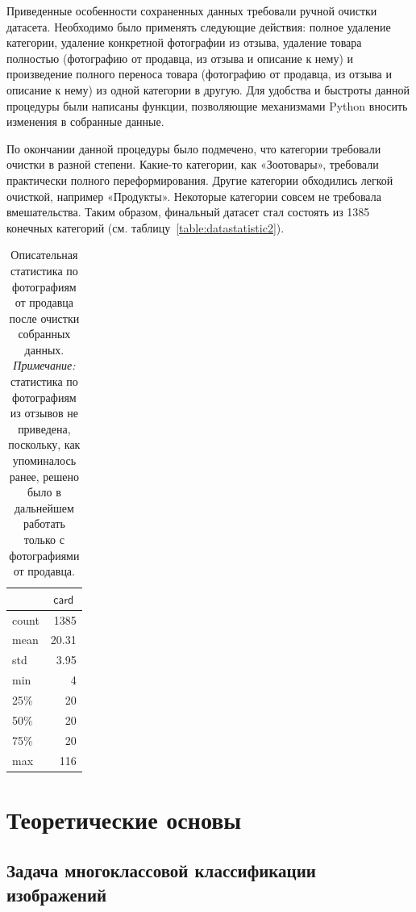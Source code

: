 \documentclass[a4paper,12pt]{extarticle}
\begin{document}
Приведенные особенности сохраненных данных требовали ручной очистки датасета. Необходимо было применять следующие действия: полное удаление категории, удаление конкретной фотографии из отзыва, удаление товара полностью (фотографию от продавца, из отзыва и описание к нему) и произведение полного переноса товара (фотографию от продавца, из отзыва и описание к нему) из одной категории в другую. Для удобства и быстроты данной процедуры были написаны функции, позволяющие механизмами Python вносить изменения в собранные данные.

По окончании данной процедуры было подмечено, что категории требовали очистки в разной степени. Какие-то категории, как «Зоотовары», требовали практически полного переформирования. Другие категории обходились легкой очисткой, например «Продукты». Некоторые категории совсем не требовала вмешательства. Таким образом, финальный датасет стал состоять из 1385 конечных категорий (см. таблицу~\ref{table:datastatistic2}).

\begin{table}[ht]
	\caption{Описательная статистика по фотографиям от продавца после очистки собранных данных. \textsl{Примечание:} статистика по фотографиям из отзывов не приведена, поскольку, как упоминалось ранее, решено было в дальнейшем работать только с фотографиями от продавца.}
	\label{table:datastatistic3}
	\footnotesize
	\centering
	\begin{tabular}{l|r}
		\toprule
		{} & \multicolumn{1}{c}{$\mathsf{card}$}\\
		\midrule
		count &	1385\\
		mean  & 20.31\\
		std   & 3.95\\
		min   &	4\\
		25\%  &	20\\
		50\%  &	20\\
		75\%  &	20\\
		max   &	116\\
		\bottomrule
	\end{tabular}
\end{table}

\newpage
\section{Теоретические основы} 

\subsection{Задача многоклассовой классификации изображений}
\end{document}
